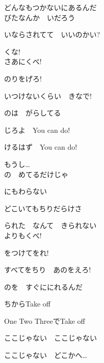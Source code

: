 どんなもつかないにあるんだ
\\

びたなんか　いだろう

いならされてて　いいのかい?

くな!
\\

さあにくべ!

のりをげろ!

いつけないくらい　きなで!

のは　がらしてる

じろよ　You can do!

けるはず　You can do!

もうし…
\\

の　めてるだけじゃ

にもわらない

どこいてもちりだらけさ


られた　なんて　きられない
\\

よりもくべ!

をつけてをれ!

すべてをちり　あのをえろ!

のを　すぐににれるんだ

ちからTake off

One Two ThreeでTake off

ここじゃない　ここじゃない

ここじゃない　どこかへ…
\\
